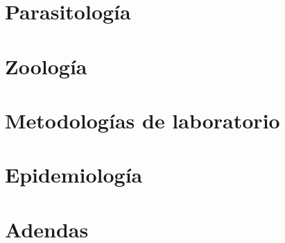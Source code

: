 \documentclass[a4paper, oneside, 10pt]{book}
\begin{document}
    \part{Parasitología}
     
     
     
     
     
    \part{Zoología}
     
    \part{Metodologías de laboratorio}
     
    \part{Epidemiología}
     
     
     
    \part{Adendas}
    \appendix
    \renewcommand*{\thesection}{\Alph{section}}\textbf{}
     
    \clearpage
     
    \clearpage
     
    \clearpage
    \renewcommand*{\thesection}{}\textbf{}
    
    
    
\end{document}
